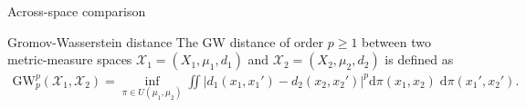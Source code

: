 \documentclass{beamer}
\newcommand{\gw}{\text{GW}}
\newcommand{\cX}{\mathcal X}
\newcommand{\rmd}{\mathrm{d}}
\begin{document}
\begin{frame}{Across-space comparison}
  \vspace{-1cm}
  \scriptsize
  \begin{block}{Gromov-Wasserstein distance \parencite{Memoli07,Memoli11}}
  The GW distance of order $p \geq 1$ between two metric-measure spaces
  $\cX_1 = (X_1, \mu_1, d_1)$ and $\cX_2 = (X_2, \mu_2, d_2)$ is defined as
  \begin{align*}
    \gw_p^p(\cX_1, \cX_2) = \inf_{\pi \in U(\mu_1, \mu_2)}
    \iint \left| d_1(x_1, x_1') - d_2(x_2, x_2') \right|^p
    \rmd\pi(x_1, x_2) \; \rmd\pi(x_1', x_2').
  \end{align*}
\end{block}



\end{frame}
\end{document}
